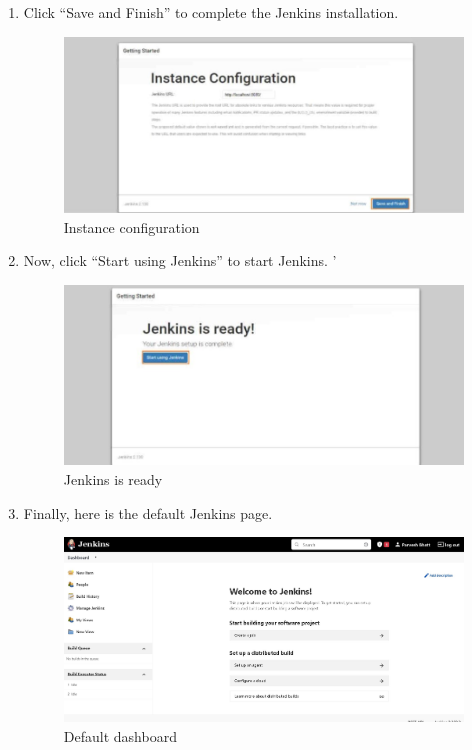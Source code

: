 \documentclass[12pt]{article}
\begin{document}
\begin{enumerate}
\item Click “Save and Finish” to complete the Jenkins installation.

\begin{figure}[H]
\centering
\includegraphics[scale=0.7]{fig61}
\caption{Instance configuration}
\vspace{0.6\baselineskip}
\end{figure}

\item Now, click “Start using Jenkins” to start Jenkins. ’

\begin{figure}[H]
\centering
\includegraphics[scale=0.7]{fig62}
\caption{Jenkins is ready}
\vspace{0.6\baselineskip}
\end{figure}

\item Finally, here is the default Jenkins page.

\begin{figure}[H]
\centering
\includegraphics[scale=0.4]{fig63}
\caption{Default dashboard}
\vspace{0.6\baselineskip}
\end{figure}

\end{enumerate}
\end{document}
